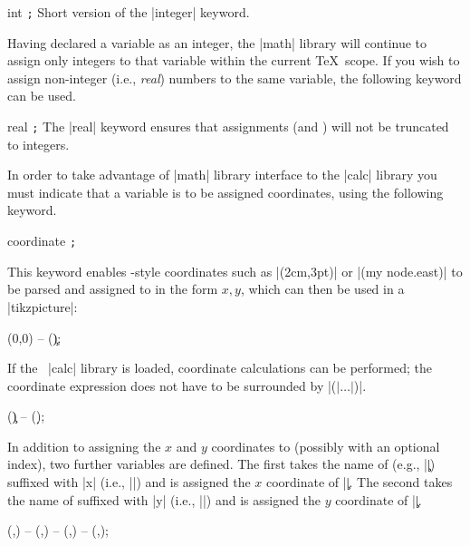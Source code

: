 \begin{math-keyword}{{int} \texttt{;}}
  Short version of the |integer| keyword.
\end{math-keyword}

  Having declared a variable as an integer, the |math| library will 
  continue to assign only integers to that variable within the 
  current \TeX\ scope. If you wish to assign non-integer (i.e., \emph{real})
  numbers to the same variable, the following keyword can be used.

\begin{math-keyword}{{real} \texttt{;}}
  The |real| keyword ensures that assignments 
  (and ) will not be truncated to integers.
\end{math-keyword}
  
  In order to take advantage of |math| library interface to the
  |calc| library  you must indicate that a variable is to be assigned 
  coordinates, using the following keyword.
  
\begin{math-keyword}{{coordinate} 
\texttt{;}}%

  This keyword enables \tikzname-style coordinates such as |(2cm,3pt)| or
  |(my node.east)| to be parsed and
  assigned to  in the form $x,y$, which can then be used
  in a |tikzpicture|:

\begin{codeexample}[]
\tikz\draw (0,0) -- (\c);
\end{codeexample}
  
  If the \tikzname\ |calc| library is loaded,
  coordinate calculations can be performed; 
  the coordinate expression does not have to be
  surrounded by |($|\ldots|$)|.
  
\begin{codeexample}[]
\tikz\draw (\c) -- (\d);
\end{codeexample}
  
  In addition to assigning the $x$ and $y$ coordinates to 
  (possibly with an optional index), two further
  variables are defined. The first takes the name of 
  (e.g., |\c|) suffixed with |x| (i.e., |\cx|) and is assigned the
  $x$ coordinate of |\c|.  
   The second takes the name of 
    suffixed with |y| (i.e., |\cy|) and is assigned the
    $y$ coordinate of |\c|.  

\begin{codeexample}[]
\tikz\draw (,) -- (,) -- (,) -- (,);
\end{codeexample}
  
\end{math-keyword}

